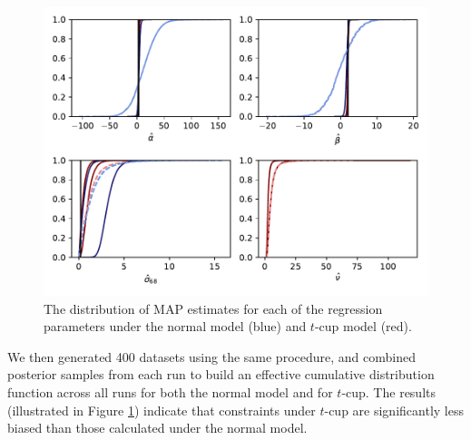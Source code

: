 \documentclass[fleqn,usenatbib]{rasti}
\begin{document}
\begin{figure}
    \includegraphics[width=\columnwidth]{graphics/fixed/outlier_cdf.pdf}
    \caption{The distribution of MAP estimates for each
    of the regression parameters under the normal model (blue) and $t$-cup model
    (red).}
    \label{fig:results.outlier.map}
\end{figure}

We then generated 400 datasets using the same procedure, and combined posterior
samples from each run to build an effective cumulative distribution function
across all runs for both the normal model and for $t$-cup. The results
(illustrated in Figure \ref{fig:results.outlier.map}) indicate that constraints
under $t$-cup are significantly less biased than those calculated under the
normal model.

% 
\end{document}
